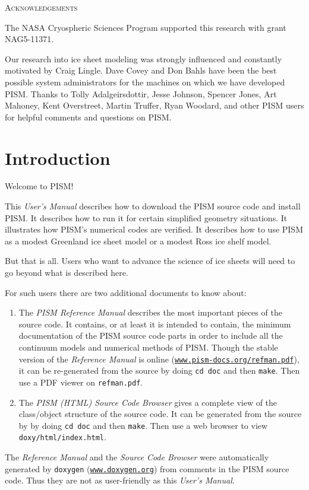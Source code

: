 \documentclass[11pt,final]{amsart}
\renewcommand{\t}[1]{\texttt{#1}}
\begin{document}
\centerline{\textsc{Acknowledgements}}
\bigskip

The NASA Cryospheric Sciences Program supported this research with grant NAG5-11371.

Our research into ice sheet modeling was strongly influenced and constantly motivated by Craig Lingle.  Dave Covey and Don Bahls have been the best possible system administrators for the machines on which we have developed PISM.  Thanks to Tolly Adalgeirsdottir, Jesse Johnson, Spencer Jones, Art Mahoney, Kent Overstreet, Martin Truffer, Ryan Woodard, and other PISM users for helpful comments and questions on PISM.

\newpage
\setcounter{tocdepth}{2}
\tableofcontents


\newpage
\section{Introduction}\label{sect:intro}

Welcome to PISM!

This \emph{User's Manual} describes how to download the PISM source code and install PISM.  It describes how to run it for certain simplified geometry situations.  It illustrates how PISM's numerical codes are verified.  It describes how to use PISM as a modest Greenland ice sheet model or a modest Ross ice shelf model.

But that is all.  Users who want to advance the science of ice sheets will need to go beyond what is described here.

For such users there are two additional documents to know about:
\begin{enumerate}
 \item  The \emph{PISM Reference Manual}
describes the most important pieces of the source code.  It contains, or at least it is intended to contain, the minimum documentation of the PISM source code parts in order to include all the continuum models and numerical methods of PISM.  Though the stable version of the \emph{Reference Manual} is online (\href{http://www.pism-docs.org/refman.pdf}{\t{www.pism-docs.org/refman.pdf}}), it can be re-generated from the source by doing \verb|cd doc| and then \verb|make|. Then use a PDF viewer on \verb|refman.pdf|.
 \item  The \emph{PISM (HTML) Source Code Browser} gives a complete view of the class/object structure of the source code.  It can be generated from the source by by doing \verb|cd doc| and then \verb|make|.  Then use a web browser to view \verb|doxy/html/index.html|.
\end{enumerate}
The \emph{Reference Manual} and the \emph{Source Code Browser} were automatically generated by \verb|doxygen| (\href{http://www.doxygen.org/}{\t{www.doxygen.org}}) from comments in the PISM source code.  Thus they are not as user-friendly as this \emph{User's Manual}.
\end{document}
